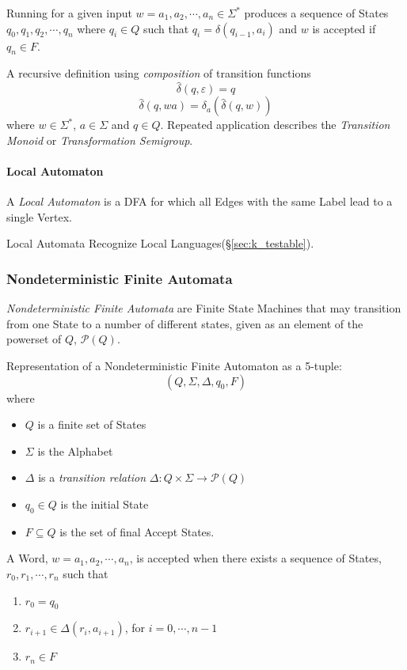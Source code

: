 Running for a given input $w = a_1,a_2, \cdots , a_n \in \Sigma^*$
produces a sequence of States $q_0,q_1,q_2,\cdots , q_n$ where $q_i
\in Q$ such that $q_i = \delta (q_{i-1},a_i)$ and $w$ is accepted if
$q_n \in F$.

A recursive definition using \emph{composition} of transition
functions
\[
    \widehat{\delta}(q,\varepsilon) = q
\]\[
    \widehat{\delta}(q,wa) = \delta_a(\widehat{\delta}(q,w))
\]
where $w \in \Sigma^*$, $a \in \Sigma$ and $q \in Q$. Repeated
application describes the \emph{Transition Monoid} or
\emph{Transformation Semigroup}.

\paragraph{Local Automaton}\label{sec:local_automaton}
A \emph{Local Automaton} is a DFA for which all Edges with the same
Label lead to a single Vertex.

Local Automata Recognize Local Languages(\S\ref{sec:k_testable}).



\subsubsection{Nondeterministic Finite Automata}\label{sec:ndfa}

\emph{Nondeterministic Finite Automata} are Finite State Machines that
may transition from one State to a number of different states, given
as an element of the powerset of $Q$, $\mathcal{P}(Q)$.

Representation of a Nondeterministic Finite Automaton as a
5-tuple:
\[
    (Q,\Sigma,\Delta,q_0,F)
\]
where
\begin{itemize}
\item $Q$ is a finite set of States
\item $\Sigma$ is the Alphabet
\item $\Delta$ is a \emph{transition relation} $\Delta: Q \times
  \Sigma \rightarrow \mathcal{P}(Q)$
\item $q_0 \in Q$ is the initial State
\item $F \subseteq Q$ is the set of final Accept States.
\end{itemize}

A Word, $w=a_1,a_2,\cdots,a_n$, is accepted when there exists a
sequence of States, $r_0,r_1,\cdots,r_n$ such that
\begin{enumerate}
\item $r_0 = q_0$
\item $r_{i+1} \in \Delta(r_i, a_{i+1})$, for $i = 0, \cdots, n-1$
\item $r_n \in F$
\end{enumerate}

